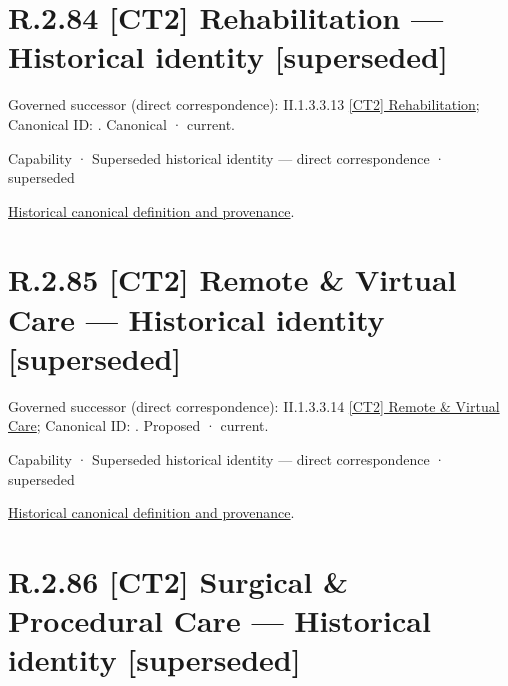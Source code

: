 \section*{R.2.84 [CT2] Rehabilitation — Historical identity [superseded]}
\label{navigation:R.2.84}

{\small Governed successor (direct correspondence): II.1.3.3.13 \hyperref[element:99ed51abcc5e4e8ba3b3d0161b17544a]{[CT2] Rehabilitation}; Canonical ID: \texttt{}. Canonical · current.}\par
\label{element:28ec21d5918a49aaac12740c69f42d77}
{\small Capability · Superseded historical identity — direct correspondence · superseded}\par
\href{../../../../../../../continuum/strategy/capability/28ec21d5918a49aaac12740c69f42d77.md}{Historical canonical definition and provenance}.\par
\section*{R.2.85 [CT2] Remote \& Virtual Care — Historical identity [superseded]}
\label{navigation:R.2.85}

{\small Governed successor (direct correspondence): II.1.3.3.14 \hyperref[element:30dff22d40b64da29ede7c41673db085]{[CT2] Remote \& Virtual Care}; Canonical ID: \texttt{}. Proposed · current.}\par
\label{element:75e2b447659c4fdf94107d94758337ed}
{\small Capability · Superseded historical identity — direct correspondence · superseded}\par
\href{../../../../../../../continuum/strategy/capability/75e2b447659c4fdf94107d94758337ed.md}{Historical canonical definition and provenance}.\par
\section*{R.2.86 [CT2] Surgical \& Procedural Care — Historical identity [superseded]}
\label{navigation:R.2.86}

